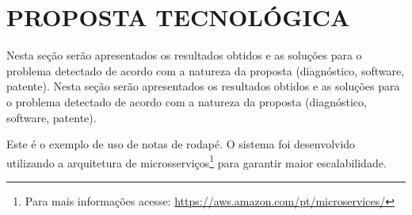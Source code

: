\chapter{PROPOSTA TECNOLÓGICA}
Nesta seção serão apresentados os resultados obtidos e as soluções para o problema detectado de acordo com a natureza da proposta (diagnóstico, software, patente).
Nesta seção serão apresentados os resultados obtidos e as soluções para o problema detectado de acordo com a natureza da proposta (diagnóstico, software, patente).

Este é o exemplo de uso de notas de rodapé. O sistema foi desenvolvido utilizando a arquitetura de microsserviços\footnote{Para mais informações acesse: \url{https://aws.amazon.com/pt/microservices/}} para garantir maior escalabilidade.

